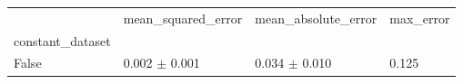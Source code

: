 \begin{tabular}{llll}
\toprule
 & mean_squared_error & mean_absolute_error & max_error \\
constant_dataset &  &  &  \\
\midrule
False & 0.002 $\pm$ 0.001 & 0.034 $\pm$ 0.010 & 0.125 \\
\bottomrule
\end{tabular}
